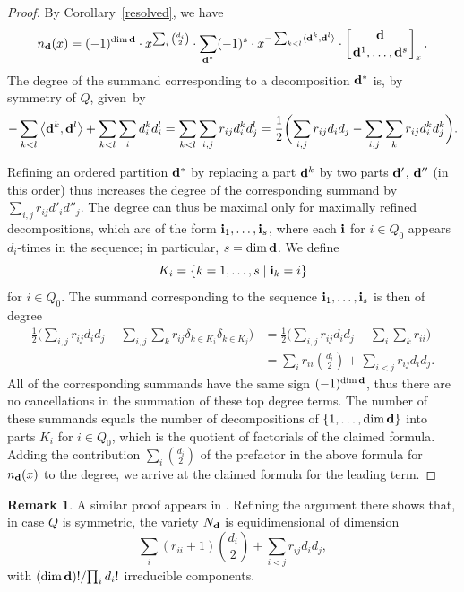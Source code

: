 \documentclass[pdftex]{sigma}
\numberwithin{equation}{section}
\theoremstyle{definition}
\newtheorem{Remark}[Theorem]{Remark}
\begin{document}
\begin{proof} By Corollary~\ref{resolved}, we have
\[n_{\bf d}(x)=(-1)^{\dim {\bf d}}\cdot{x}^{\sum_i{d_i\choose 2}}\cdot\sum_{{\bf d}^*}(-1)^s\cdot{x}^{-\sum_{k<l}\langle{\bf d}^k,{\bf d}^l\rangle}\cdot\left[{{\bf d}\atop{{\bf d}^1,\dots,{\bf d}^s}}\right]_{x}.\]
The degree of the summand corresponding to a decomposition ${\bf d}^*$ is, by symmetry of $Q$, given~by
\[-\sum_{k<l}\big\langle{\bf d}^k,{\bf d}^l\big\rangle+\sum_{k<l}\sum_id^k_id^l_i=\sum_{k<l}\sum_{i,j}r_{ij}d^k_id^l_j=\frac{1}{2} \biggl(\sum_{i,j}r_{ij}d_id_j-\sum_{i,j}\sum_kr_{ij}d^k_id^k_j\biggr).\]

Refining an ordered partition ${\bf d}^*$ by replacing a part ${\bf d}^k$ by two parts ${\bf d}'$, ${\bf d}''$ (in this order) thus increases the degree of the corresponding summand by $\sum_{i,j}r_{ij}d'_id''_j$. The degree can thus be maximal only for maximally refined decompositions, which are of the form ${\bf i}_1,\dots,{\bf i}_s$, where each ${\bf i}$ for $i\in Q_0$ appears $d_i$-times in the sequence; in particular, $s=\dim {\bf d}$. We define \[K_i=\{k=1,\dots,s \mid {\bf i}_k=i\}\] for $i\in Q_0$. The summand corresponding to the sequence ${\bf i}_1,\dots,{\bf i}_s$ is then of degree
\begin{align*}
\frac{1}{2}\biggl(\sum_{i,j}r_{ij}d_id_j-\sum_{i,j}\sum_kr_{ij}\delta_{k\in K_i}\delta_{k\in K_j}\biggr)
&=\frac{1}{2}\biggl(\sum_{i,j}r_{ij}d_id_j-\sum_i\sum_kr_{ii}\biggr)\\
&=\sum_ir_{ii}{d_i\choose 2}+\sum_{i<j}r_{ij}d_id_j.\end{align*}
All of the corresponding summands have the same sign $(-1)^{\dim {\bf d}}$, thus there are no cancellations in the summation of these top degree terms. The number of these summands equals the number of decompositions of $\{1,\dots,\dim{\bf d}\}$ into parts $K_i$ for $i\in Q_0$, which is the quotient of factorials of the claimed formula. Adding the contribution $\sum_i{d_i\choose 2}$ of the prefactor in the above formula for $n_{\bf d}(x)$ to the degree, we arrive at the claimed formula for the leading term.\end{proof}

\begin{Remark}
A similar proof appears in \cite[Theorem~4.1]{RSmall}. Refining the argument there shows that, in case $Q$ is symmetric, the variety $N_{\bf d}$ is equidimensional of dimension
\[\sum _{i}(r_{ii}+1){d_i\choose 2}+\sum_{i<j}r_{ij}d_id_j,\]
with ${(\dim{\bf d})!}/{\prod_id_i!}$
irreducible components.
\end{Remark}
\end{document}
